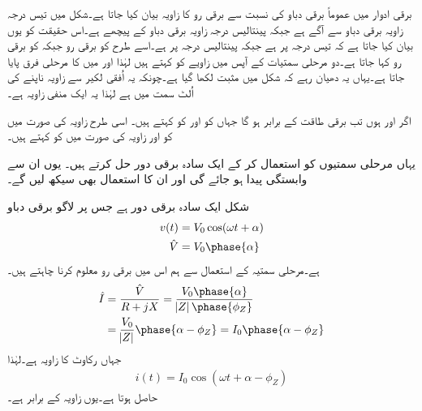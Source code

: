 برقی ادوار میں عموماً برقی دباو  کی نسبت سے  برقی رو   کا زاویہ بیان کیا جاتا ہے۔شکل    میں  تیس درجہ زاویہ برقی دباو سے آگے ہے جبکہ    پینتالیس درجہ زاویہ برقی دباو کے  پیچھے  ہے۔اس حقیقت کو یوں بیان کیا جاتا ہے کہ  تیس درجہ   پر  ہے جبکہ   پینتالیس درجہ   پر ہے۔اسے طرح  کو  برقی رو جبکہ  کو  برقی رو کہا جاتا ہے۔دو مرحلی سمتیات کے آپس میں زاویے کو  کہتے ہیں لہٰذا  اور  میں  کا مرحلی فرق پایا جاتا ہے۔یہاں یہ دھیان رہے کہ شکل میں   مثبت لکھا گیا ہے۔چونکہ یہ اُفقی لکیر سے زاویہ ناپنے کی اُلٹ سمت میں ہے لہٰذا یہ ایک منفی زاویہ ہے۔

اگر  اور  ہوں تب برقی طاقت  کے برابر ہو گا جہاں  کو   اور  کو  کہتے ہیں۔ اسی طرح  زاویہ کی صورت میں  کو  اور  زاویہ کی صورت میں  کو  کہتے ہیں۔

یہاں مرحلی سمتیوں کو استعمال کر کے ایک سادہ برقی دور حل کرتے ہیں۔ یوں ان سے وابستگی پیدا ہو جائے گی اور ان کا استعمال بھی سیکھ لیں گے۔

شکل    ایک سادہ   برقی دور ہے جس پر لاگو برقی دباو
\begin{gather}
\begin{aligned}
v(t)&=V_0 \cos (\omega t +\alpha)\\
\hat{V}&=V_0 \phase{\alpha}
\end{aligned}
\end{gather}
ہے۔مرحلی سمتیہ کے استعمال سے ہم اس میں برقی رو  معلوم کرنا چاہتے ہیں۔
\begin{gather}
\begin{aligned}
\hat{I}&=\frac{\hat{V}}{R+j X}=\frac{V_0 \phase{\alpha}}{\abs{Z} \phase {\phi_Z}}\\
&=\frac{V_0}{\abs{Z}} \phase{\alpha-\phi_Z}=I_0 \phase{\alpha-\phi_Z}
\end{aligned}
\end{gather}
جہاں  رکاوٹ کا زاویہ  ہے۔لہٰذا
\begin{align}\label{مساوات_بنیادی_حقائق_دوری_سمتیہ_سے_مزاحمت_امالہ_دور_حل}
i(t)=I_0 \cos (\omega t +\alpha-\phi_Z)
\end{align}
حاصل ہوتا ہے۔یوں  زاویہ  کے برابر ہے۔
